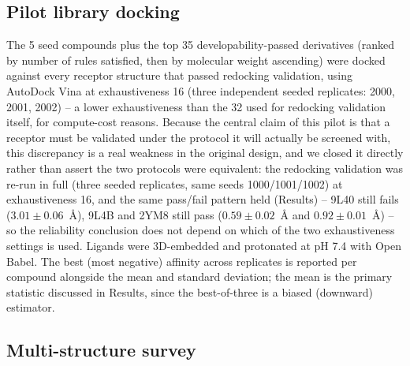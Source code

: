 \documentclass[11pt]{article}
\begin{document}
\subsection*{Pilot library docking}

The 5 seed compounds plus the top 35 developability-passed derivatives
(ranked by number of rules satisfied, then by molecular weight ascending)
were docked against every receptor structure that passed redocking
validation, using AutoDock Vina at exhaustiveness 16 (three independent
seeded replicates: 2000, 2001, 2002) -- a lower exhaustiveness than the 32
used for redocking validation itself, for compute-cost reasons. Because the
central claim of this pilot is that a receptor must be validated under the
protocol it will actually be screened with, this discrepancy is a real
weakness in the original design, and we closed it directly rather than
assert the two protocols were equivalent: the redocking validation was
re-run in full (three seeded replicates, same seeds 1000/1001/1002) at
exhaustiveness 16, and the same pass/fail pattern held (Results) -- 9L40
still fails ($3.01\pm0.06$~{\AA}), 9L4B and 2YM8 still pass
($0.59\pm0.02$~{\AA} and $0.92\pm0.01$~{\AA}) -- so the reliability
conclusion does not depend on which of the two exhaustiveness settings is
used. Ligands were 3D-embedded and protonated at pH 7.4 with Open Babel.
The best (most negative) affinity across replicates is reported per
compound alongside the mean and standard deviation; the mean is the primary
statistic discussed in Results, since the best-of-three is a biased
(downward) estimator.

\subsection*{Multi-structure survey}
\end{document}
